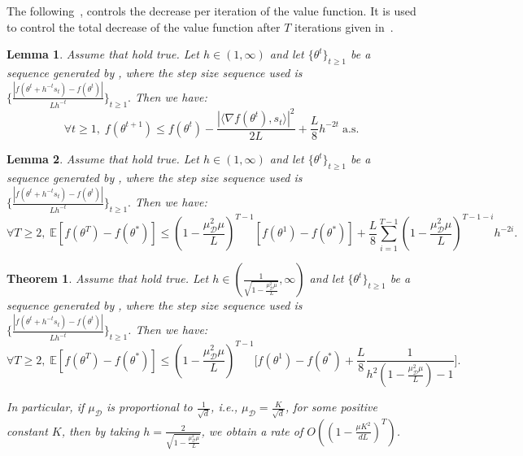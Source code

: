 \documentclass{article} %
\newtheorem{theorem}{Theorem}
\newtheorem{lemma}{Lemma}
\begin{document}
The following~, controls the decrease per iteration of the value function. It is used to control the total decrease of the value function after $T$ iterations given in~. 

\begin{lemma}\label{Lemma5}
Assume that  hold true.   Let $h \in (1, \infty)$  and let $\{\theta^t\}_{t \ge 1}$ be a sequence generated by , where the step size sequence used is $\{ \frac{|f(\theta^t+h^{-t} s_t)-f(\theta^t) |}{L h^{-t}}\}_{t \ge 1}.$ 
Then we have: $$\forall t \ge 1,\;   f(\theta^{t+1}) \le  f(\theta^t)-\frac{  |\langle \nabla f(\theta^t),s_t\rangle|^2 }{2L}+\frac{L}{8}h^{-2t}\; \text{a.s.}$$
\end{lemma}



\begin{lemma}\label{Lemma6}
 Assume that   hold true. Let $h\in (1 , \infty)$ and let $\{\theta^t\}_{t \ge 1}$ be a sequence generated by , where the step size sequence used is $\{\frac{|f(\theta^t+h^{-t} s_t)-f(\theta^t) |}{L h^{-t}}\}_{t \ge 1}.$ Then we have:
$$\forall T \ge 2,\;
\mathbb{E}[f(\theta^{T})-f(\theta^{*})  ]  \leq\left(1-\frac{\mu_{\mathcal{D}}^2 \mu}{L}\right)^{T-1} [f(\theta^{1})-f(\theta^{*})  ]+ \frac{L}{8}\sum_{i=1}^{T-1}\left(1-\frac{\mu_{\mathcal{D}}^2 \mu}{L}\right)^{T-1-i} h^{-2i}.$$
     
\end{lemma}

\begin{theorem}\label{Thm7}
 Assume that  hold true. Let  $h \in \left(\frac{1}{\sqrt{1-\frac{\mu_{\mathcal{D}}^2 \mu}{L}}}, \infty \right)$ and
   let  $\{\theta^t\}_{t \ge 1}$ be a sequence generated by , where the step size sequence used is $\{\frac{|f(\theta^t+h^{-t} s_t)-f(\theta^t) |}{L h^{-t}}\}_{t \ge 1}$. Then we have:
\begin{equation}\label{eq-strong-exp}
\forall T \ge 2, \;
\mathbb{E}[f(\theta^{T})-f(\theta^{*})  ]  \leq \left(1-\frac{\mu_{\mathcal{D}}^2 \mu}{L}\right)^{T-1} \bigg[f(\theta^{1})-f(\theta^{*})  
+\frac{L}{8}  
\frac{ 1}{h^2 \left(1-\frac{\mu_{\mathcal{D}}^2 \mu}{L} \right)- 1 } \bigg].
\end{equation}

In particular, if $\mu_{\mathcal{D}}$ is proportional to $\frac{1}{\sqrt{d}}$, i.e., $\mu_{\mathcal{D}} = \frac{K}{\sqrt{d}}$, for some positive constant $K$, then by taking $h=\frac{2}{\sqrt{1-\frac{\mu_{\mathcal{D}}^2 \mu}{L}}}$, we obtain a rate of $O\left(\left(1 - \frac{\mu K^2}{dL}\right)^T\right)$. 
\end{theorem}
\end{document}
